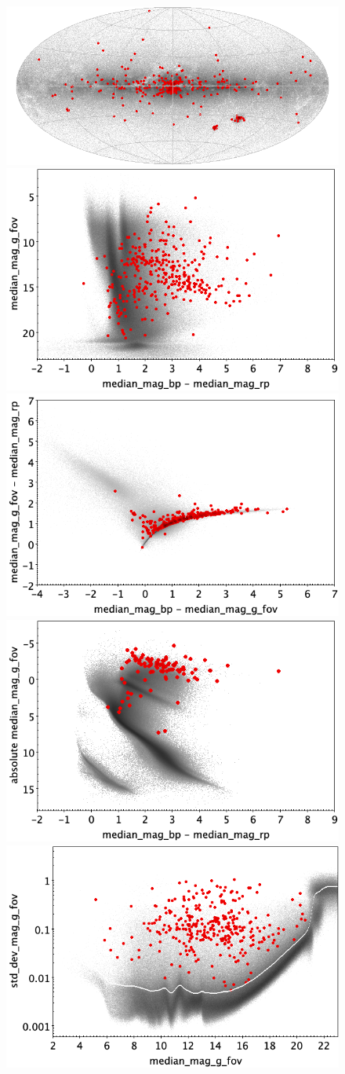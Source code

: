 \documentclass[longauth]{aa}
\begin{document}
\begin{appendix}
\begin{figure}
\centering
{} \includegraphics[width=0.6\hsize]{figures/appendix/SYST_trn_sky.png} \\ %
\vspace{4mm}
 \includegraphics[width=0.45\hsize]{figures/appendix/SYST_trn_cm.png}  %
\hspace{2mm}
 \includegraphics[width=0.45\hsize]{figures/appendix/SYST_trn_cc.png} \\ %
\vspace{4mm}
 \includegraphics[width=0.45\hsize]{figures/appendix/SYST_trn_cam.png}  %
\hspace{2mm}
 \includegraphics[width=0.45\hsize]{figures/appendix/SYST_trn_msd.png} \\ %

\end{figure}
\end{appendix}
\end{document}
